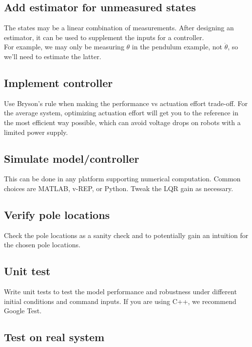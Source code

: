 \documentclass[10pt,conference,compsoc]{IEEEtran}
\begin{document}
\subsection{Add estimator for unmeasured states}

The states may be a linear combination of measurements. After designing an
estimator, it can be used to supplement the inputs for a controller. \\

For example, we may only be measuring $\theta$ in the pendulum example, not
$\dot{\theta}$, so we'll need to estimate the latter.

\subsection{Implement controller}

Use Bryson's rule when making the performance vs actuation effort trade-off. For
the average system, optimizing actuation effort will get you to the reference in
the most efficient way possible, which can avoid voltage drops on robots with a
limited power supply.

\subsection{Simulate model/controller}

This can be done in any platform supporting numerical computation. Common
choices are MATLAB, v-REP, or Python. Tweak the LQR gain as necessary.

\subsection{Verify pole locations}

Check the pole locations as a sanity check and to potentially gain an intuition
for the chosen pole locations.

\subsection{Unit test}

Write unit tests to test the model performance and robustness under different
initial conditions and command inputs. If you are using C++, we recommend Google
Test.

\subsection{Test on real system}
\end{document}
